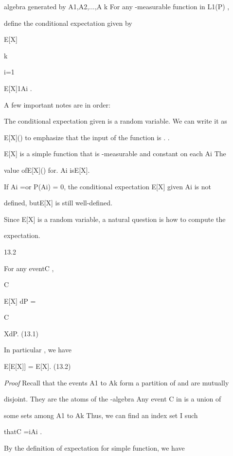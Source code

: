 algebra generated by A1,A2,...,A k For any -measurable function in L1(P) ,

define the conditional expectation given by

E[X\vert{}] \coloneqq

k\sum

i=1

E[X\vertAi]1Ai .

A few important notes are in order:

The conditional expectation given is a random variable. We can write it as

E[X\vert{}]() to emphasize that the input of the function is . .

E[X\vert{}] is a simple function that is -measurable and constant on each Ai The

value ofE[X\vert{}]() for. \in Ai isE[X\vertAi].

If Ai =\emptyset or P(Ai) = 0, the conditional expectation E[X\vertAi] given Ai is not

defined, butE[X\vert{}] is still well-defined.

Since E[X\vert{}] is a random variable, a natural question is how to compute the

expectation.

\begin{thmbox}{13.2}
\end{thmbox}

For any eventC \in{},

\int

C

E[X\vert{}] dP =

\int

C

XdP. (13.1)

In particular , we have

E[E[X\vert{}]] = E[X]. (13.2)

\textit{Proof} Recall that the events A1 to Ak form a partition of \Omega and are mutually

disjoint. They are the atoms of the \sigma-algebra Any event C in is a union of

some sets among A1 to Ak Thus, we can find an index set I  such

thatC =\cup i\inI Ai .

By the definition of expectation for simple function, we have

